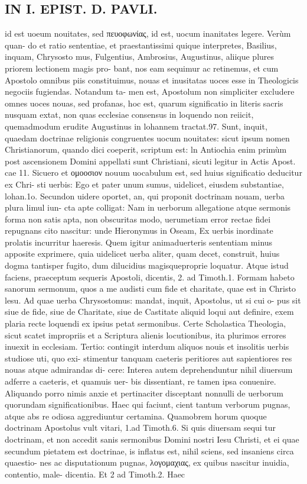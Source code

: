 \documentclass{article}
\begin{document}
\begin{pages}
\section*{IN I. EPIST. D. PAVLI. }
\marginpar{[ p.17 ]}\pstart id est uoeum nouitates, sed πευοφωνίας, id est, uocum inanitates legere. Verùm quan- do et ratio sententiae, et praestantissimi quique  interpretes, Basilius, inquam, Chrysosto mus, Fulgentius, Ambrosius, Augustinus, aliique  plures priorem lectionem magis pro- bant, nos eam sequimur ac retinemus, et cum Apostolo omnibus piis constituimus, nouas et inusitatas uoces esse in Theologicis negociis fugiendas. Notandum ta- men est, Apostolum non simpliciter excludere omnes uoces nouas, sed profanas, hoc est, quarum significatio in literis sacris nusquam extat, non quas ecclesiae consensus in loquendo non reiicit, quemadmodum erudite Augustinus in lohannem tractat.97. Sunt, inquit, quaedam doctrinae religionis congruentes uocum nouitates: sicut ipsum nomen Christianorum, quando dici coeperit, scriptum est: ln Antiochia enim primùm post ascensionem Domini appellati sunt Christiani, sicuti legitur in Actis Apost. cae 11. Sicuero et ομοοσιον nouum uocabulum est, sed huius significatio deducitur ex Chri- sti uerbis: Ego et pater unum sumus, uidelicet, eiusdem substantiae, lohan.1o.  \pend\pstart Secundon uidere oportet, an, qui proponit doctrinam nouam, uerba plura limul iun- cta apte colligat: Nam in uerborum allegatione atque sermonis forma non satis apta, non obscuritas modo, uerumetiam error rectae fidei repugnans cito nascitur: unde Hieronymus in Oseam, Ex uerbis inordinate prolatis incurritur haeresis. Quem igitur animaduerteris sententiam minus apposite exprimere, quia uidelicet uerba aliter, quam decet, construit, huius dogma tantisper fugito, dum dilucidius magisqueproprie loquatur. Atque  istud faciens, praeceptum sequeris Apostoli, dicentis, 2. ad Timoth.1.   Formam habeto sanorum sermonum, quos a me audisti cum fide et charitate, quae est   in Christo lesu. Ad quae uerba Chrysostomus: mandat, inquit, Apostolus, ut si cui o- pus sit siue de fide, siue de Charitate, siue de Castitate aliquid loqui aut definire, exem plaria recte loquendi ex ipsius petat sermonibus. Certe Scholastica Theologia, sicut scatet impropriis et a Scriptura alienis locutionibus, ita plurimos errores inuexit in ecclesiam.  \pend\pstart Tertio: contingit interdum aliquos nouis et insolitis uerbis studiose uti, quo exi- stimentur tanquam caeteris peritiores aut sapientiores res nouas atque  admirandas di- cere: Interea autem deprehenduntur nihil diuersum adferre a caeteris, et quamuis uer- bis dissentiant, re tamen ipsa conuenire. Aliquando porro nimis anxie et pertinaciter disceptant nonnulli de uerborum quorundam significationibus. Haec qui faciunt, cient tantum verborum pugnas, atque  abs re odiosa aggrediuntur certamina. Quamobrem   horum quoque  doctrinam Apostolus vult vitari, 1.ad Timoth.6. Si quis diuersam sequi   tur doctrinam, et non accedit sanis sermonibus Domini nostri Iesu Christi, et ei quae   secundum pietatem est doctrinae, is inflatus est, nihil sciens, sed insaniens circa quaestio-   nes ac disputationum pugnas, λογομαχιας, ex quibus nascitur inuidia, contentio, male-   dicentia. Et 2 ad Timoth.2. Haec 
\end{pages}
\end{document}
